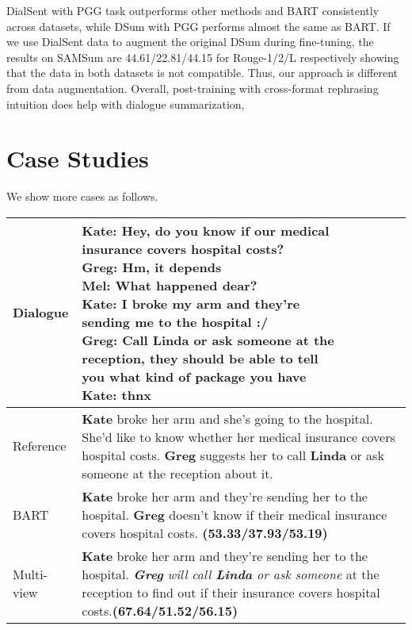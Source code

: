 DialSent with PGG task outperforms other methods and BART consistently across datasets, while DSum with PGG performs almost the same as BART.
If we use DialSent data to augment the original DSum during fine-tuning, the results on SAMSum are 44.61/22.81/44.15 for Rouge-1/2/L respectively showing that the data in both datasets is not compatible. Thus, our approach is different from data augmentation.
Overall, post-training with cross-format rephrasing intuition does help with dialogue summarization,




\section{Case Studies}
\label{sec:cases}
We show more cases as follows.


\begin{table}[th]
	\small
	\centering
	\begin{tabular}{lp{4.9cm}}
		\toprule[1pt]
		{Dialogue} &  \makecell[l]{\textbf{Kate}: Hey, do you know if our medical \\insurance covers hospital costs? \\\textbf{Greg}: Hm, it depends \\\textbf{Mel}: What happened dear? \\\textbf{Kate}: I broke my arm and they're \\sending me to the hospital :/ \\\textbf{Greg}: Call Linda or ask someone at the \\reception, they should be able to tell \\you what kind of package you have \\\textbf{Kate}: thnx} \\
		
		\hline
		{Reference} & \textbf{Kate} broke her arm and she's going to the hospital. She'd like to know whether her medical insurance covers hospital costs. \textbf{Greg} suggests her to call \textbf{Linda} or ask someone at the reception about it. \\
		
		
		\hline
		{BART} &   \textbf{Kate} broke her arm and they're sending her to the hospital. \textbf{Greg} doesn't know if their medical insurance covers hospital costs. \textbf{(53.33/37.93/53.19)}\\
		
		\hline
		{Multi-view} &  \textbf{Kate} broke her arm and they're sending her to the hospital. \textit{\textbf{Greg} will call \textbf{Linda} or ask someone} at the reception to find out if their insurance covers hospital costs.\textbf{(67.64/51.52/56.15)}\\
		

\end{tabular}
\end{table}
